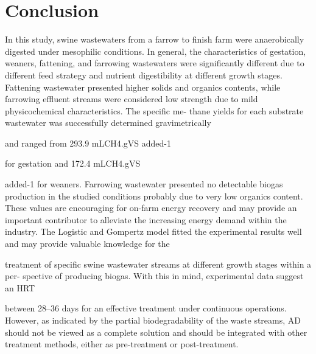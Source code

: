 \section{Conclusion}
In this study, swine wastewaters from a farrow to finish farm were anaerobically digested under mesophilic conditions. In general, the characteristics of gestation, weaners, fattening, and farrowing wastewaters were significantly different due to different feed strategy and nutrient digestibility at different growth stages. Fattening wastewater presented higher solids and organics contents, while farrowing effluent streams were
considered low strength due to mild physicochemical characteristics. The specific me-
thane yields for each substrate wastewater was successfully determined gravimetrically

and ranged from 293.9 mLCH4.gVS added-1

for gestation and 172.4 mLCH4.gVS

added-1
for weaners. Farrowing wastewater presented no detectable biogas production
in the studied conditions probably due to very low organics content. These values are
encouraging for on-farm energy recovery and may provide an important contributor to
alleviate the increasing energy demand within the industry. The Logistic and Gompertz
model fitted the experimental results well and may provide valuable knowledge for the

treatment of specific swine wastewater streams at different growth stages within a per-
spective of producing biogas. With this in mind, experimental data suggest an HRT

between 28–36 days for an effective treatment under continuous operations. However,
as indicated by the partial biodegradability of the waste streams, AD should not be
viewed as a complete solution and should be integrated with other treatment methods,
either as pre-treatment or post-treatment.